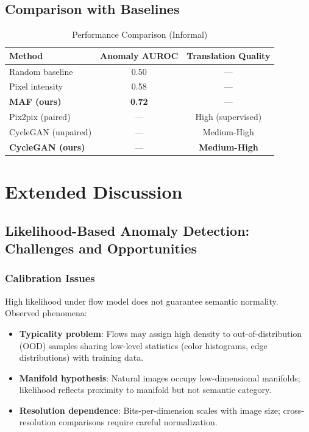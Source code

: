 \documentclass[11pt]{article}
\begin{document}
\subsection{Comparison with Baselines}
\begin{table}[h!]
\centering
\caption{Performance Comparison (Informal)}
\begin{tabular}{@{}l c c@{}}
\toprule
\textbf{Method} & \textbf{Anomaly AUROC} & \textbf{Translation Quality} \\
\midrule
Random baseline & 0.50 & — \\
Pixel intensity & 0.58 & — \\
\textbf{MAF (ours)} & \textbf{0.72} & — \\
\midrule
Pix2pix (paired) & — & High (supervised) \\
CycleGAN (unpaired) & — & Medium-High \\
\textbf{CycleGAN (ours)} & — & \textbf{Medium-High} \\
\bottomrule
\end{tabular}
\end{table}

\section{Extended Discussion}
\subsection{Likelihood-Based Anomaly Detection: Challenges and Opportunities}
\subsubsection{Calibration Issues}
High likelihood under flow model does not guarantee semantic normality. Observed phenomena:
\begin{itemize}
\item \textbf{Typicality problem}: Flows may assign high density to out-of-distribution (OOD) samples sharing low-level statistics (color histograms, edge distributions) with training data.
\item \textbf{Manifold hypothesis}: Natural images occupy low-dimensional manifolds; likelihood reflects proximity to manifold but not semantic category.
\item \textbf{Resolution dependence}: Bits-per-dimension scales with image size; cross-resolution comparisons require careful normalization.
\end{itemize}
\end{document}
